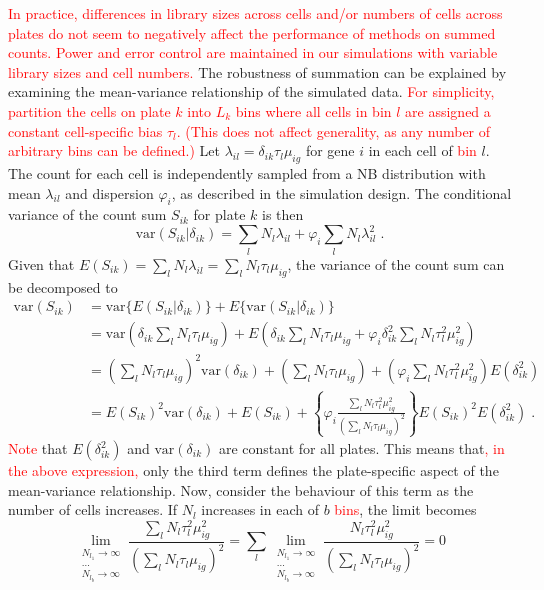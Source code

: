 \documentclass{article}
\newcommand\revised[1]{\textcolor{red}{#1}}
\begin{document}
\revised{In practice, differences in library sizes across cells and/or numbers of cells across plates do not seem to negatively affect the performance of methods on summed counts.
Power and error control are maintained in our simulations with variable library sizes and cell numbers.}
The robustness of summation can be explained by examining the mean-variance relationship of the simulated data.
\revised{For simplicity, partition the cells on plate $k$ into $L_k$ bins where all cells in bin $l$ are assigned a constant cell-specific bias $\tau_l$.
(This does not affect generality, as any number of arbitrary bins can be defined.)}
Let $\lambda_{il} = \delta_{ik}\tau_{l}\mu_{ig}$ for gene $i$ in each cell of \revised{bin} $l$.
The count for each cell is independently sampled from a NB distribution with mean $\lambda_{il}$ and dispersion $\varphi_i$, as described in the simulation design.
The conditional variance of the count sum $S_{ik}$ for plate $k$ is then
\[
    \mbox{var}(S_{ik} | \delta_{ik}) = \sum_{l} N_l \lambda_{il}  + \varphi_{i} \sum_{l} N_l \lambda_{il}^2 \;.
\]
Given that $E(S_{ik}) = \sum_l N_l\lambda_{il} = \sum_l N_l \tau_l \mu_{ig}$, the variance of the count sum can be decomposed to
\begin{align*}
    \mbox{var}(S_{ik}) 
    &= \mbox{var}\{E(S_{ik} | \delta_{ik} ) \} + E\{ \mbox{var}(S_{ik} | \delta_{ik}) \}\\
    &= \mbox{var}\left(\delta_{ik}\sum_l N_l \tau_{l}\mu_{ig}\right) + E\left(\delta_{ik}\sum_l  N_l\tau_l\mu_{ig}  + \varphi_{i} \delta_{ik}^2 \sum_l  N_l\tau_l^2\mu_{ig}^2\right)\\
    &= \left(\sum_l N_l \tau_{l}\mu_{ig} \right)^2 \mbox{var}(\delta_{ik}) + \left(\sum_l N_l \tau_{l}\mu_{ig}\right) + \left( \varphi_i \sum_l  N_l\tau_l^2\mu_{ig}^2 \right) E(\delta_{ik}^2) \\
    &= E(S_{ik})^2 \mbox{var}(\delta_{ik}) + E(S_{ik}) + \left\{ \varphi_i \frac{\sum_l N_l \tau_l^2\mu_{ig}^2}{ (\sum_l N_l \tau_l\mu_{ig})^2}  \right\} E(S_{ik})^2 E(\delta_{ik}^2) \;. 
\end{align*}
\revised{Note} that $E(\delta_{ik}^2)$ and $\mbox{var}(\delta_{ik})$ are constant for all plates.
This means that\revised{, in the above expression,} only the third term defines the plate-specific aspect of the mean-variance relationship.
Now, consider the behaviour of this term as the number of cells increases.
If $N_l$ increases in each of $b$ \revised{bins}, the limit becomes
\[
    \lim_{\substack{N_{l_1} \to \infty \\ \dots \\ N_{l_b} \to \infty}} \frac{\sum_l N_l \tau_l^2\mu_{ig}^2}{ (\sum_l N_l \tau_l\mu_{ig})^2} 
    = \sum_l \lim_{\substack{N_{l_1} \to \infty \\ \dots \\ N_{l_b} \to \infty}} \frac{N_l \tau_l^2\mu_{ig}^2}{ (\sum_l N_l \tau_l\mu_{ig})^2} 
= 0
\]
\end{document}
